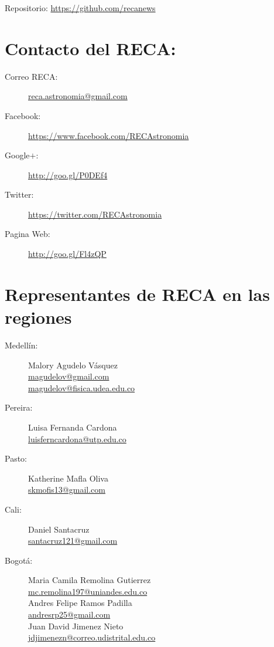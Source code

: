 Repositorio: \url{https://github.com/recanews}\\



\section*{Contacto del RECA:}

\begin{description}
\item[Correo RECA:]\url{reca.astronomia@gmail.com}
\item[Facebook:] \url{https://www.facebook.com/RECAstronomia}
\item[Google$+$:] \url{http://goo.gl/P0DEf4}
\item[Twitter:] \url{https://twitter.com/RECAstronomia}
\item[Pagina Web:] \url{http://goo.gl/Fl4zQP}
\end{description}


\section*{Representantes de RECA en las regiones}
\begin{description}
\item[Medellín:]Malory Agudelo Vásquez\\
\url{magudelov@gmail.com}\\ \url{magudelov@fisica.udea.edu.co}
\item[Pereira:]Luisa Fernanda Cardona\\ \url{luisferncardona@utp.edu.co}
\item[Pasto:]Katherine Mafla Oliva\\
\url{skmofis13@gmail.com}
\item[Cali:]Daniel Santacruz\\
\url{santacruz121@gmail.com}
\item[Bogotá:]Maria Camila Remolina Gutierrez\\
\url{mc.remolina197@uniandes.edu.co}\\

Andres Felipe Ramos Padilla\\
\url{andresrp25@gmail.com}\\

Juan David Jimenez Nieto\\
\url{jdjimenezn@correo.udistrital.edu.co}
\end{description}


